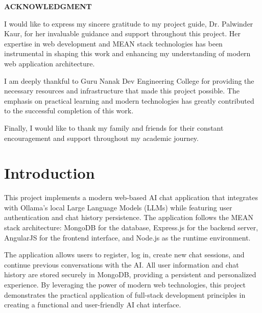\documentclass[12pt,a4paper]{article}
\begin{document}
\begin{center}
    \textbf{ACKNOWLEDGMENT}
\end{center}
I would like to express my sincere gratitude to my project guide, Dr. Palwinder Kaur, for her invaluable guidance and support throughout this project. Her expertise in web development and MEAN stack technologies has been instrumental in shaping this work and enhancing my understanding of modern web application architecture.

I am deeply thankful to Guru Nanak Dev Engineering College for providing the necessary resources and infrastructure that made this project possible. The emphasis on practical learning and modern technologies has greatly contributed to the successful completion of this work.

Finally, I would like to thank my family and friends for their constant encouragement and support throughout my academic journey.

\newpage

\setcounter{tocdepth}{1}
\setlength{\cftbeforesecskip}{0pt}
\setlength{\cftbeforetoctitleskip}{-1em}
\tableofcontents
\newpage

\section{Introduction}
This project implements a modern web-based AI chat application that integrates with Ollama's local Large Language Models (LLMs) while featuring user authentication and chat history persistence. The application follows the MEAN stack architecture: MongoDB for the database, Express.js for the backend server, AngularJS for the frontend interface, and Node.js as the runtime environment.

The application allows users to register, log in, create new chat sessions, and continue previous conversations with the AI. All user information and chat history are stored securely in MongoDB, providing a persistent and personalized experience. By leveraging the power of modern web technologies, this project demonstrates the practical application of full-stack development principles in creating a functional and user-friendly AI chat interface.
\end{document}
